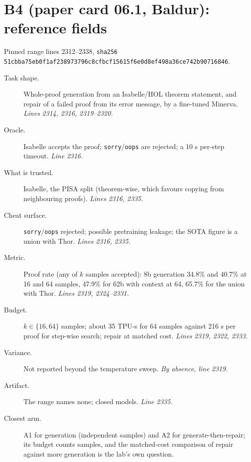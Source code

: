 \documentclass[11pt]{article}
\begin{document}
\section*{B4 (paper card 06.1, Baldur): reference fields}
Pinned range lines 2312--2338,
\texttt{sha256 51cbba75eb0f1af238973796c8cfbcf15615f6e0d8ef498a36ce742b90716846}.
\begin{description}
\item[Task shape.] Whole-proof generation from an Isabelle/HOL theorem
  statement, and repair of a failed proof from its error message, by a
  fine-tuned Minerva. \emph{Lines 2314, 2316, 2319--2320.}
\item[Oracle.] Isabelle accepts the proof; \texttt{sorry}/\texttt{oops} are
  rejected; a 10 s per-step timeout. \emph{Line 2316.}
\item[What is trusted.] Isabelle, the PISA split (theorem-wise, which favours
  copying from neighbouring proofs). \emph{Lines 2316, 2335.}
\item[Cheat surface.] \texttt{sorry}/\texttt{oops} rejected; possible
  pretraining leakage; the SOTA figure is a union with Thor. \emph{Lines
  2316, 2335.}
\item[Metric.] Proof rate (any of $k$ samples accepted): 8b generation 34.8\%
  and 40.7\% at 16 and 64 samples, 47.9\% for 62b with context at 64, 65.7\%
  for the union with Thor. \emph{Lines 2319, 2324--2331.}
\item[Budget.] $k \in \{16, 64\}$ samples; about 35 TPU-s for 64 samples
  against 216 s per proof for step-wise search; repair at matched cost.
  \emph{Lines 2319, 2322, 2333.}
\item[Variance.] Not reported beyond the temperature sweep. \emph{By absence,
  line 2319.}
\item[Artifact.] The range names none; closed models. \emph{Line 2335.}
\item[Closest arm.] A1 for generation (independent samples) and A2 for
  generate-then-repair; its budget counts samples, and the matched-cost
  comparison of repair against more generation is the lab's own question.
\end{description}

\end{document}
